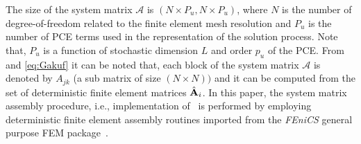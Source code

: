 \documentclass[letter,1p,11pt,oneside,onecolumn,sort&compress]{elsarticle}
\begin{document}
The size of the system matrix $\mathcal{A}$ is $(N\times P_{u} ,  N\times P_{u})$, where $N$ is the number of degree-of-freedom related to the finite element mesh resolution and $P_{u}$ is the number of PCE terms used in the representation of the solution process.
Note that, $P_{u}$ is a function of stochastic dimension $L$ and order $p_{u}$ of the PCE.
From  and \eqref{eq:Gakuf} it can be noted that, each block of the system matrix $\mathcal{A}$ is denoted by $A_{jk}$ (a sub matrix of size $(N \times N))$ and it can be computed from the set of deterministic finite element matrices ${\hat{{\mathrm{\bf{A}}}}_i}$. %
In this paper, the system matrix assembly procedure, i.e., implementation of~ is performed by
employing deterministic finite element assembly routines imported from the {\it{FEniCS}} general purpose FEM package~\cite{logg2012FEniCS,aloggs2013puffin}.


\end{document}

